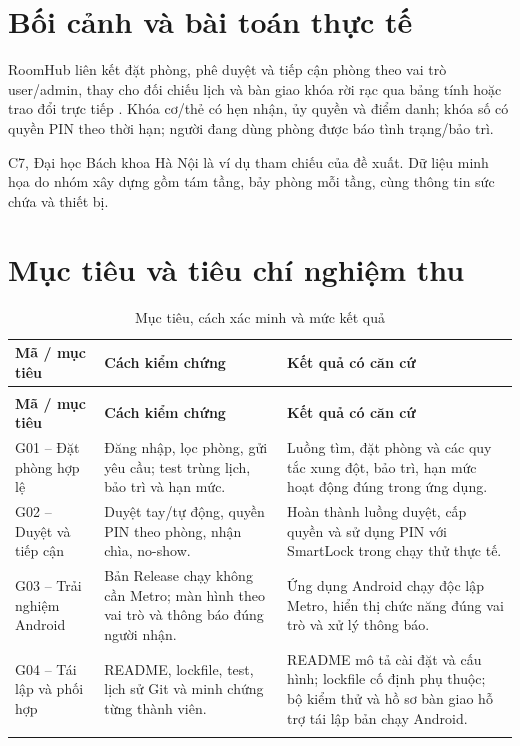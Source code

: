 \section{Bối cảnh và bài toán thực tế}
RoomHub liên kết đặt phòng, phê duyệt và tiếp cận phòng theo vai trò user/admin, thay cho đối chiếu lịch và bàn giao khóa rời rạc qua bảng tính hoặc trao đổi trực tiếp \cite{quytrinh2026}. Khóa cơ/thẻ có hẹn nhận, ủy quyền và điểm danh; khóa số có quyền PIN theo thời hạn; người đang dùng phòng được báo tình trạng/bảo trì.

C7, Đại học Bách khoa Hà Nội là ví dụ tham chiếu của đề xuất. Dữ liệu minh họa do nhóm xây dựng gồm tám tầng, bảy phòng mỗi tầng, cùng thông tin sức chứa và thiết bị.

\section{Mục tiêu và tiêu chí nghiệm thu}
{\tabletext\renewcommand{\arraystretch}{1.04}\begin{longtable}{>{\raggedright\arraybackslash}p{}>{\raggedright\arraybackslash}p{}>{\raggedright\arraybackslash}p{}}
\caption{Mục tiêu, cách xác minh và mức kết quả}\label{tab:goals}\\
\toprule \textbf{Mã / mục tiêu} & \textbf{Cách kiểm chứng} & \textbf{Kết quả có căn cứ}\\\midrule
\endfirsthead
\multicolumn{3}{l}{\small Mục tiêu, cách xác minh và mức kết quả (tiếp)}\\
\toprule \textbf{Mã / mục tiêu} & \textbf{Cách kiểm chứng} & \textbf{Kết quả có căn cứ}\\\midrule
\endhead
\bottomrule\endlastfoot
G01 -- Đặt phòng hợp lệ & Đăng nhập, lọc phòng, gửi yêu cầu; test trùng lịch, bảo trì và hạn mức. & Luồng tìm, đặt phòng và các quy tắc xung đột, bảo trì, hạn mức hoạt động đúng trong ứng dụng.\\\addlinespace[1.5pt]
G02 -- Duyệt và tiếp cận & Duyệt tay/tự động, quyền PIN theo phòng, nhận chìa, no-show. & Hoàn thành luồng duyệt, cấp quyền và sử dụng PIN với SmartLock trong chạy thử thực tế.\\\addlinespace[1.5pt]
G03 -- Trải nghiệm Android & Bản Release chạy không cần Metro; màn hình theo vai trò và thông báo đúng người nhận. & Ứng dụng Android chạy độc lập Metro, hiển thị chức năng đúng vai trò và xử lý thông báo.\\\addlinespace[1.5pt]
G04 -- Tái lập và phối hợp & README, lockfile, test, lịch sử Git và minh chứng từng thành viên. & README mô tả cài đặt và cấu hình; lockfile cố định phụ thuộc; bộ kiểm thử và hồ sơ bàn giao hỗ trợ tái lập bản chạy Android.\\\addlinespace[1.5pt]
\end{longtable}}

